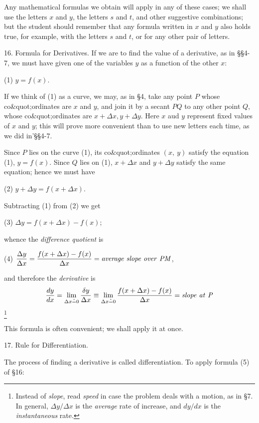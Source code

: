 \documentclass[12pt]{article}
\begin{document}
Any mathematical formulas we obtain will apply in any of
these cases; we shall use the letters $x$ and $y$, the letters $s$ and
$t$, and other suggestive combinations; but the student should
remember that any formula written in $x$ and $y$ also holds true,
for example, with the letters $s$ and $t$, or for any other pair of
letters.

16. Formula for Derivatives. If we are to find the value of
a derivative, as in \S\S 4-7, we must have given one of the 
variables $y$ as a function of the other $x$:
\begin{center}
(1)   $y=f(x)$.
\end{center}
If we think of (1) as a curve, we may, as in \S 4, take any
point $P$ whose co\&quot;{o}rdinates are $x$ and $y$, and join it by a secant
$PQ$ to any other point $Q$, whose co\&quot;{o}rdinates are 
$x+\Delta x, y+\Delta y$.
Here $x$ aud $y$ represent fixed values
of $x$ and $y$; this will prove more 
convenient than to use new letters
each time, as we did in'\S\S 4-7.

Since $P$ lies on the curve (1), its
co\&quot;{o}rdinates $(x,\ y)$ satisfy the 
equation (1), $y=f(x)$. Since $Q$ lies on
(1), $x+\Delta x$ and $y+\Delta y$ satisfy the
same equation; hence we must have
\begin{center}
(2)   $y+\Delta y=f(x+\Delta x)$.
\end{center}
Subtracting (1) from (2) we get
\begin{center}
(3)   $\Delta y=f(x+\Delta x)-f(x)$;
\end{center}
whence the {\it difference quotient} is
\begin{center}
(4) $\displaystyle \frac{\Delta y}{\Delta x}=
\frac{f(x+\Delta x)-f(x)}{\Delta x}=
{\it average\ slope\ over\ PM}$,
\end{center}
and therefore the {\it derivative} is
$$
\frac{dy}{dx} =
\lim_{\Delta x \doteq 0} \frac{\delta y}{\Delta x} \equiv
\lim_{\Delta x \doteq 0} \frac{f(x+\Delta x)-f(x)}{\Delta x}=
{\it slope\ at\ P}
$$
\footnote{Instead of {\it slope}, read {\it speed} in case the problem 
deals with a motion, as in \S 7. In general, $\Delta y/\Delta x$ is the
{\it average} rate of increase, and $dy/dx$ is the
{\it instantaneous} rate.}

This formula is often convenient; we shall apply it at once.

17. Rule for Differentiation.

The process of finding a derivative is called differentiation. 
To apply formula (5) of \S 16:
\end{document}
